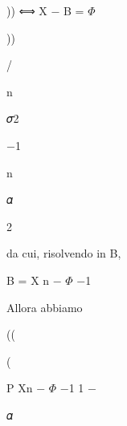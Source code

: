 \documentclass[a4paper,portrait,12pt]{article}
\begin{document}
\begin{flushleft}
)) ⟺ X $-$ B = $\Phi$
\end{flushleft}


))


/


\begin{flushleft}
n
\end{flushleft}





\begin{flushleft}
𝜎2
\end{flushleft}





$-$1





\begin{flushleft}
n
\end{flushleft}





\begin{flushleft}
𝛼
\end{flushleft}


2





\begin{flushleft}
da cui, risolvendo in B,
\end{flushleft}


\begin{flushleft}
B = X n $-$ $\Phi$ $-$1
\end{flushleft}


\begin{flushleft}
Allora abbiamo
\end{flushleft}





((


(





\begin{flushleft}
P Xn $-$ $\Phi$ $-$1 1 $-$
\end{flushleft}





\begin{flushleft}
𝛼
\end{flushleft}
\end{document}
